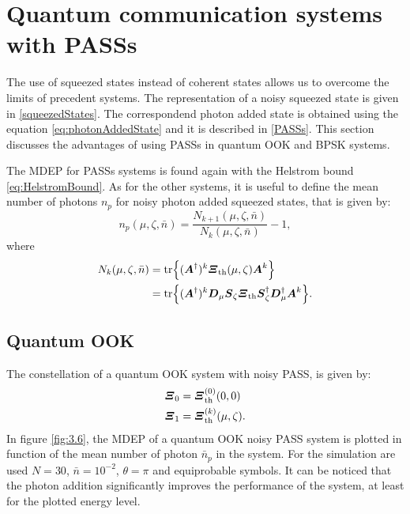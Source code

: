 \section{Quantum communication systems with PASSs}
    The use of squeezed states instead of coherent states allows us to overcome the limits
    of precedent systems. The representation of a noisy squeezed state is given in 
    \ref{squeezedStates}. The correspondend photon added state is obtained using the equation
    \ref{eq:photonAddedState} and it is described in \ref{PASSs}. This section discusses the advantages of using PASSs 
    in quantum OOK and BPSK systems.

    The MDEP for PASSs systems is found again with the Helstrom bound \ref{eq:HelstromBound}.
    As for the other systems, it is useful to define the mean number of photons $n_p$ for noisy 
    photon added squeezed states, that is given by:
    \begin{equation}
        n_p(\mu,\zeta,\bar{n}) = \frac{N_{k+1}(\mu,\zeta,\bar{n})}{N_k(\mu,\zeta,\bar{n})}-1,
        \label{eq:np_PASS}
    \end{equation}
    where
    \begin{equation}
        \begin{split}
            N_k(\mu,\zeta,\bar{n}) &= \tr{(\Operator{A}^\dagger)^k \Operator{\varXi}_{\mathrm{th}}(\mu,\zeta) \Operator{A}^k}\\
                                    &= \tr{(\Operator{A}^\dagger)^k \Operator{D}_\mu \Operator{S}_\zeta \Operator{\varXi}_{\mathrm{th}}
                                    \Operator{S}_\zeta^\dagger \Operator{D}_\mu^\dagger \Operator{A}^k}.
        \end{split}
    \end{equation}

    \subsection{Quantum OOK}
        The constellation of a quantum OOK system with noisy PASS, is given by:
        \begin{subequations}
            \begin{align}
                \Operator{\varXi}_0 &= \Operator{\varXi}_{\mathrm{th}}^{(0)}(0,0)\\
                \Operator{\varXi}_1 &= \Operator{\varXi}_{\mathrm{th}}^{(k)}(\mu,\zeta).
            \end{align}
        \end{subequations}
        In figure \ref{fig:3.6}, the MDEP of a quantum OOK noisy PASS system is plotted in function
        of the mean number of photon $\bar{n}_p$ in the system. For the simulation are used $N=30$, $\bar{n}=10^{-2}$, $\theta=\pi$ and
        equiprobable symbols.
        It can be noticed that the photon addition significantly improves the performance of the system,
        at least for the plotted energy level.

